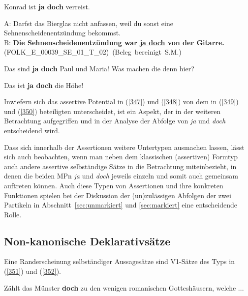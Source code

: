 \begin{exe}
	\ex\label{347} 
	Konrad ist \textbf{ja doch} verreist.	
\end{exe}
\vspace{-0.65cm}
\begin{exe}
	\ex\label{348} 
	\scriptsize
	A: Darfst das Bierglas nicht anfassen, weil du sonst eine Sehnenscheidenentzündung bekommst.\\
	B: \textbf{Die Sehnenscheidenentzündung war \underline{ja doch} von der Gitarre.}
	\newline
	\hbox{}\hfill\hbox{(FOLK\_E\_00039\_SE\_01\_T\_02) (Beleg bereinigt S.M.)}	
\end{exe}
\vspace{-0.65cm}
\begin{exe}
	\ex\label{349} 
	Das sind \textbf{ja doch} Paul und Maria! Was machen die denn hier?	
\end{exe}		
\vspace{-0.65cm}
\begin{exe}
	\ex\label{350} 
	Das ist \textbf{ja doch} die Höhe!
\end{exe}	
Inwiefern sich das assertive Potential in (\ref{347}) und (\ref{348}) von dem in (\ref{349}) und (\ref{350}) beteiligten unterscheidet, ist ein Aspekt, der in der weiteren Betrachtung aufgegriffen und in der Analyse der Abfolge von \textit{ja} und \textit{doch} entscheidend wird. 

Dass sich innerhalb der Assertionen weitere Untertypen ausmachen lassen, lässt sich auch beobachten, wenn man neben dem klassischen (assertiven) Formtyp auch andere assertive selbständige Sätze in die Betrachtung miteinbezieht, in denen die beiden MPn \textit{ja} und \textit{doch} jeweils einzeln und somit auch gemeinsam auftreten können. Auch diese Typen von Assertionen und ihre konkreten Funktionen spielen bei der Diskussion der (un)zulässigen Abfolgen der zwei Partikeln in Abschnitt~\ref{sec:unmarkiert} und \ref{sec:markiert} eine entscheidende Rolle.
				  
\subsection{Non-kanonische Deklarativsätze}
\label{sec:nonkan}
Eine Randerscheinung selbständiger Aussagesätze sind V1-Sätze des Typs in (\ref{351}) und (\ref{352}).

\begin{exe}
	\ex\label{351} 
	Zählt das Münster \textbf{doch} zu den wenigen romanischen Gotteshäusern, welche ...
	\hfill\hbox{\citet[294]{Oennerfors1997}}	
\end{exe}

